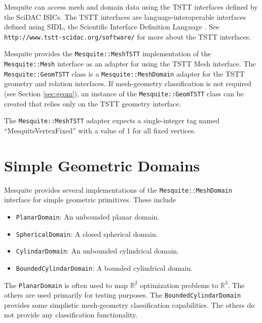 Mesquite can access mesh and domain data using the TSTT \cite{tstt} interfaces 
defined by the SciDAC ISICs.  The TSTT interfaces are language-interoperable 
interfaces defined using SIDL, the Scientific Interface Definition Language
\cite{babel}.  See \texttt{http://www.tstt-scidac.org/software/} for more
about the TSTT interfaces.

Mesquite provides the \texttt{Mesquite::MeshTSTT} implementation of the 
\texttt{Mesquite::Mesh} interface as an adapter for using the TSTT Mesh
interface.  The \texttt{Mesquite::GeomTSTT} class is a
\texttt{Mesquite::MeshDomain} adapter for the TSTT geometry and relation
interfaces.  If mesh-geometry classification is not required (see Section
\ref{sec:geom}), an instance of the \texttt{Mesquite::GeomTSTT} class can be
created that relies only on the TSTT geometry interface.  

The \texttt{Mesquite::MeshTSTT} adapter expects a single-integer tag named 
``MesquiteVertexFixed'' with a value of 1 for all fixed vertices.

\section{Simple Geometric Domains} \label{sec:MsqGeom}

Mesquite provides several implementations of the
\texttt{Mesquite::MeshDomain} interface for simple geometric primitives.  These
include
\begin{itemize}
\item \texttt{PlanarDomain}: An unbounded planar domain.
\item \texttt{SphericalDomain}: A closed spherical domain.
\item \texttt{CylindarDomain}: An unbounded cylindrical domain.
\item \texttt{BoundedCylindarDomain}: A bounded cylindrical domain.
\end{itemize}
The \texttt{PlanarDomain} is often used to map $\mathbb{R}^{2}$ optimization
problems to $\mathbb{R}^{3}$.  The others are used primarily for testing
purposes.  The \texttt{BoundedCylindarDomain} provides some simplistic
mesh-geometry classification capabilities.  The others do not provide any
classification functionality.  
